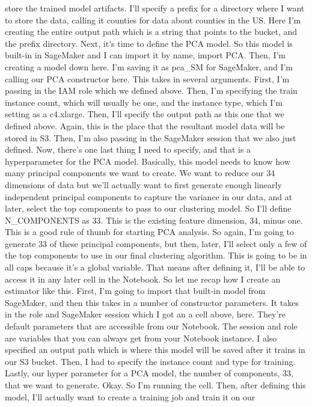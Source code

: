 store the trained model artifacts. I'll specify a prefix for a directory
where I want to store the data, calling it counties for data about
counties in the US. Here I'm creating the entire output path which is a
string that points to the bucket, and the prefix directory. Next, it's
time to define the PCA model. So this model is built-in in SageMaker and
I can import it by name, import PCA. Then, I'm creating a model down
here. I'm saving it as pca\_SM for SageMaker, and I'm calling our PCA
constructor here. This takes in several arguments. First, I'm passing in
the IAM role which we defined above. Then, I'm specifying the train
instance count, which will usually be one, and the instance type, which
I'm setting as a c4.xlarge. Then, I'll specify the output path as this
one that we defined above. Again, this is the place that the resultant
model data will be stored in S3. Then, I'm also passing in the SageMaker
session that we also just defined. Now, there's one last thing I need to
specify, and that is a hyperparameter for the PCA model. Basically, this
model needs to know how many principal components we want to create. We
want to reduce our 34 dimensions of data but we'll actually want to
first generate enough linearly independent principal components to
capture the variance in our data, and at later, select the top
components to pass to our clustering model. So I'll define N\_COMPONENTS
as 33. This is the existing feature dimension, 34, minus one. This is a
good rule of thumb for starting PCA analysis. So again, I'm going to
generate 33 of these principal components, but then, later, I'll select
only a few of the top components to use in our final clustering
algorithm. This is going to be in all caps because it's a global
variable. That means after defining it, I'll be able to access it in any
later cell in the Notebook. So let me recap how I create an estimator
like this. First, I'm going to import that built-in model from
SageMaker, and then this takes in a number of constructor parameters. It
takes in the role and SageMaker session which I got an a cell above,
here. They're default parameters that are accessible from our Notebook.
The session and role are variables that you can always get from your
Notebook instance. I also specified an output path which is where this
model will be saved after it trains in our S3 bucket. Then, I had to
specify the instance count and type for training. Lastly, our hyper
parameter for a PCA model, the number of components, 33, that we want to
generate. Okay. So I'm running the cell. Then, after defining this
model, I'll actually want to create a training job and train it on our
